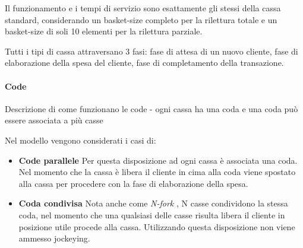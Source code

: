 \begin{enumerate}
Il funzionamento e i tempi di servizio sono esattamente gli stessi della cassa standard, considerando un basket-size completo per la rilettura totale e un basket-size di soli 10 elementi per la rilettura parziale.
\end{enumerate}

Tutti i tipi di cassa attraversano 3 fasi: fase di attesa di un nuovo cliente, fase di elaborazione della spesa del cliente, fase di completamento della transazione.

\paragraph{Code} 
Descrizione di come funzionano le code - ogni cassa ha una coda e una
coda può essere associata a più casse

Nel modello vengono considerati i casi di:

\begin{itemize}
\item \textbf{Code parallele} Per questa disposizione ad ogni cassa è
  associata una coda. Nel momento che la cassa è libera il cliente in
  cima alla coda viene spostato alla cassa per procedere con la fase
  di elaborazione della spesa.
\item \textbf{Coda condivisa} Nota anche come \textit{N-fork} \cite{yanagisawa2011methods}, N casse
  condividono la stessa coda, nel momento che una qualsiasi delle
  casse risulta libera il cliente in posizione utile procede alla
  cassa. Utilizzando questa disposizione non viene ammesso jockeying.
\end{itemize}

